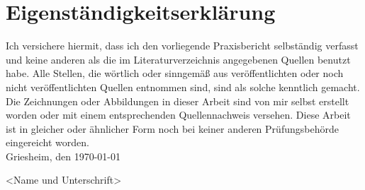 \section*{Eigenständigkeitserklärung}
Ich versichere hiermit, dass ich den vorliegende Praxisbericht selbständig verfasst
und keine anderen als die im Literaturverzeichnis angegebenen Quellen benutzt habe.
Alle Stellen, die wörtlich oder sinngemäß aus veröffentlichten oder noch nicht
veröffentlichten Quellen entnommen sind, sind als solche kenntlich gemacht. Die
Zeichnungen oder Abbildungen in dieser Arbeit sind von mir selbst erstellt worden
oder mit einem entsprechenden Quellennachweis versehen. Diese Arbeit ist in
gleicher oder ähnlicher Form noch bei keiner anderen Prüfungsbehörde eingereicht
worden.
\\[5mm]
Griesheim, den \today

<Name und Unterschrift>
